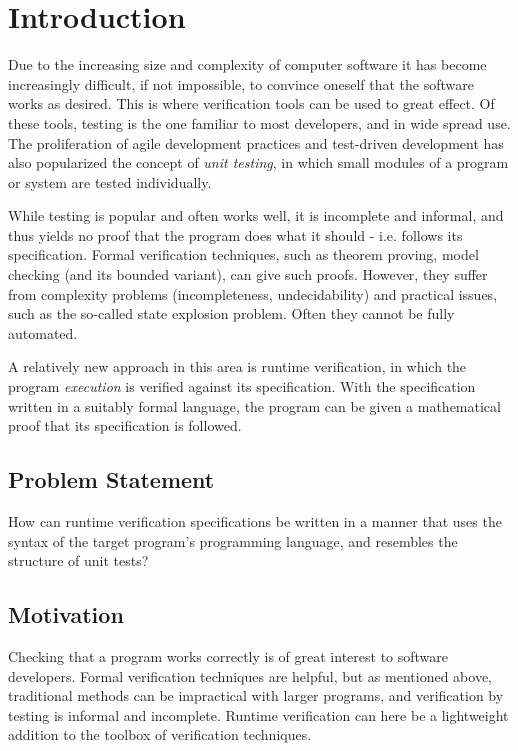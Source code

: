 \documentclass[a4paper,11pt]{kth-mag}
\begin{document}
\pagestyle{newchap}
\chapter{Introduction} \label{chapter-introduction}

Due to the increasing size and complexity of computer software it has become
increasingly difficult, if not impossible, to convince oneself that the
software works as desired. This is where verification tools can be used to
great effect. Of these tools, testing is the one familiar to most developers,
and in wide spread use. The proliferation of agile development practices and
test-driven development has also popularized the concept of \textit{unit
testing}, in which small modules of a program or system are tested
individually.

While testing is popular and often works well, it is incomplete and informal,
and thus yields no proof that the program does what it should - i.e. follows
its specification. Formal verification techniques, such as theorem proving,
model checking (and its bounded variant), can give such proofs. However, they
suffer from complexity problems (incompleteness, undecidability) and practical
issues, such as the so-called state explosion problem. Often they cannot be
fully automated.

A relatively new approach in this area is runtime verification, in which the
program \textit{execution} is verified against its specification. With the
specification written in a suitably formal language, the program can be given a
mathematical proof that its specification is followed.


\section{Problem Statement} \label{section-problem-statement}

How can runtime verification specifications be written in a manner that uses
the syntax of the target program's programming language, and resembles
the structure of unit tests?


\section{Motivation}

Checking that a program works correctly is of great interest to software
developers. Formal verification techniques are helpful, but as mentioned above,
traditional methods can be impractical with larger programs, and verification
by testing is informal and incomplete. Runtime verification can here be a
lightweight addition to the toolbox of verification techniques.
\end{document}
